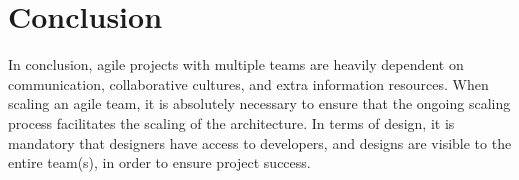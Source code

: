 \documentclass[sigplan,screen]{acmart}
\begin{document}
\section{Conclusion}
In conclusion, agile projects with multiple teams are heavily dependent on communication, collaborative cultures, and extra information resources. When scaling an agile team, it is absolutely necessary to ensure that the ongoing scaling process facilitates the scaling of the architecture. In terms of design, it is mandatory that designers have access to developers, and designs are visible to the entire team(s), in order to ensure project success.

%


\end{document}
